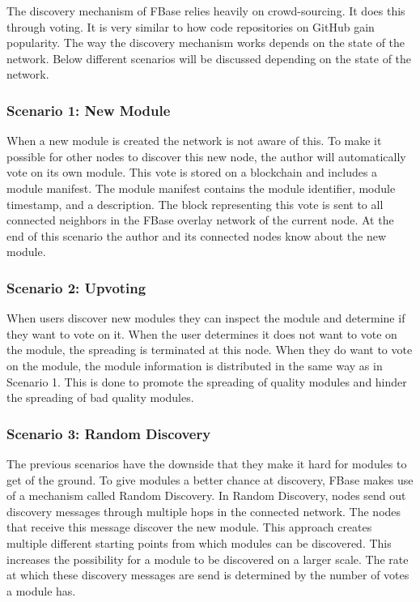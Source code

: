The discovery mechanism of FBase relies heavily on crowd-sourcing. It does this through voting. It is very similar to how code repositories on GitHub gain popularity. The way the discovery mechanism works depends on the state of the network. Below different scenarios will be discussed depending on the state of the network.

\subsubsection{\textbf{Scenario 1: New Module}}

When a new module is created the network is not aware of this. To make it possible for other nodes to discover this new node, the author will automatically vote on its own module. This vote is stored on a blockchain and includes a module manifest. The module manifest contains the module identifier, module timestamp, and a description. The block representing this vote is sent to all connected neighbors in the FBase overlay network of the current node. At the end of this scenario the author and its connected nodes know about the new module.

\subsubsection{\textbf{Scenario 2: Upvoting}}

When users discover new modules they can inspect the module and determine if they want to vote on it. When the user determines it does not want to vote on the module, the spreading is terminated at this node. When they do want to vote on the module, the module information is distributed in the same way as in Scenario 1. This is done to promote the spreading of quality modules and hinder the spreading of bad quality modules. 

\subsubsection{\textbf{Scenario 3: Random Discovery}}

The previous scenarios have the downside that they make it hard for modules to get of the ground. To give modules a better chance at discovery, FBase makes use of a mechanism called Random Discovery. In Random Discovery, nodes send out discovery messages through multiple hops in the connected network. The nodes that receive this message discover the new module. This approach creates multiple different starting points from which modules can be discovered. This increases the possibility for a module to be discovered on a larger scale. The rate at which these discovery messages are send is determined by the number of votes a module has.

